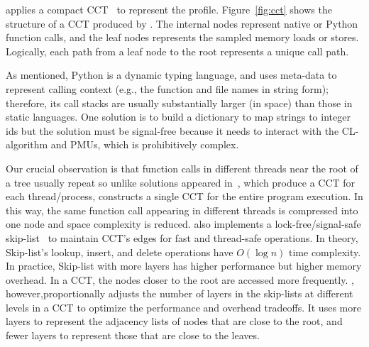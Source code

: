 \tool applies a compact CCT~\cite{arnold2000approximating, ammons1997exploiting} to represent the profile. Figure~\ref{fig:cct} shows the structure of a CCT produced by \tool. The internal nodes represent native or Python function calls, and the leaf nodes represents the sampled memory loads or stores.
Logically, each path from a leaf node to the root represents a unique call path. 

As mentioned, Python is a dynamic typing language, and uses meta-data to represent calling context (e.g., the function and file names in string form); therefore, its call stacks are usually substantially larger (in space) than those in static languages. One solution is to build a dictionary to map strings to integer ids but the solution must be signal-free because it needs to interact with the CL-algorithm and PMUs, which is prohibitively complex.


Our crucial observation is that function calls in different threads near the root of a tree usually repeat so unlike solutions appeared in~\cite{chabbi2012deadspy, wen2017redspy, loadspy, chabbi2014call, su2019pinpointing}, which  produce a CCT for each thread/process, \tool{} constructs a single CCT for the entire program execution. In this way, the same function call appearing in different threads is compressed into one node and space complexity is reduced. \tool also implements a lock-free/signal-safe skip-list~\cite{pugh1990skip} to maintain CCT's edges for fast and thread-safe operations. In theory, Skip-list's lookup, insert, and delete operations have $O(\log n)$ time complexity.
In practice,
Skip-list with more layers has higher performance but higher memory overhead. In a CCT, the nodes closer to the root are accessed more frequently. \tool, however,proportionally adjusts the number of layers in the skip-lists at different levels in a CCT to optimize the performance and overhead tradeoffs. It uses more layers to represent the adjacency lists of nodes that are close to the root, and fewer layers to represent those that are close to the leaves. 




